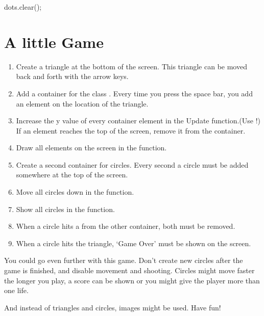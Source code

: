 \begin{code}
dots.clear();
\end{code}

\section{A little Game}

\begin{enumerate}
\item Create a triangle at the bottom of the screen. This triangle can be moved back and forth with the arrow keys.
\item Add a container for the class . Every time you press the space bar, you add an element on the location of the triangle.
\item Increase the y value of every container element in the Update function.(Use !) If an element reaches the top of the screen, remove it from the container.
\item Draw all elements on the screen in the  function.
\item Create a second container for circles. Every second a circle must be added somewhere at the top of the screen.
\item Move all circles down in the  function.
\item Show all circles in the  function.
\item When a circle hits a  from the other container, both must be removed.
\item When a circle hits the triangle, `Game Over' must be shown on the screen.
\end{enumerate}

You could go even further with this game. Don't create new circles after the game is finished, and disable movement and shooting. Circles might move faster the longer you play, a score can be shown or you might give the player more than one life.

And instead of triangles and circles, images might be used. Have fun!

